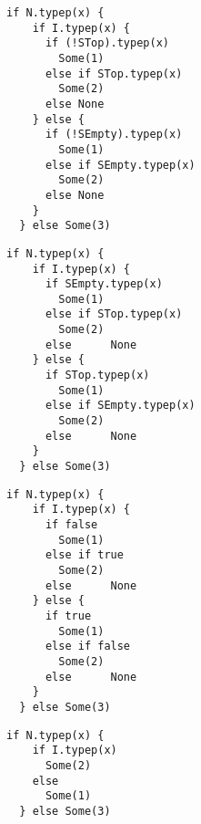 \newsavebox\typecaseHbox
\begin{lrbox}{\typecaseHbox}
  \begin{minipage}{8cm}
\begin{lstlisting}[style=scalaioScala]
  if N.typep(x) {
    if I.typep(x) {
      if (!STop).typep(x)
        Some(1)
      else if STop.typep(x)
        Some(2)
      else None
    } else {
      if (!SEmpty).typep(x)
        Some(1)
      else if SEmpty.typep(x)
        Some(2)
      else None
    }
  } else Some(3)
\end{lstlisting}
  \end{minipage}
\end{lrbox}

\newsavebox\typecaseIbox
\begin{lrbox}{\typecaseIbox}
  \begin{minipage}{8cm}
\begin{lstlisting}[style=scalaioScala]
  if N.typep(x) {
    if I.typep(x) {
      if SEmpty.typep(x)
        Some(1)
      else if STop.typep(x)
        Some(2)
      else      None
    } else {
      if STop.typep(x)
        Some(1)
      else if SEmpty.typep(x)
        Some(2)
      else      None
    }
  } else Some(3)
\end{lstlisting}
  \end{minipage}
\end{lrbox}

\newsavebox\typecaseJbox
\begin{lrbox}{\typecaseJbox}
  \begin{minipage}{8cm}
\begin{lstlisting}[style=scalaioScala]
  if N.typep(x) {
    if I.typep(x) {
      if false
        Some(1)
      else if true
        Some(2)
      else      None
    } else {
      if true
        Some(1)
      else if false
        Some(2)
      else      None
    }
  } else Some(3)
\end{lstlisting}
  \end{minipage}
\end{lrbox}

\newsavebox\typecaseKbox
\begin{lrbox}{\typecaseKbox}
  \begin{minipage}{8cm}
\begin{lstlisting}[style=scalaioScala]
  if N.typep(x) {
    if I.typep(x)
      Some(2)
    else
      Some(1)
  } else Some(3)
\end{lstlisting}
  \end{minipage}
\end{lrbox}



